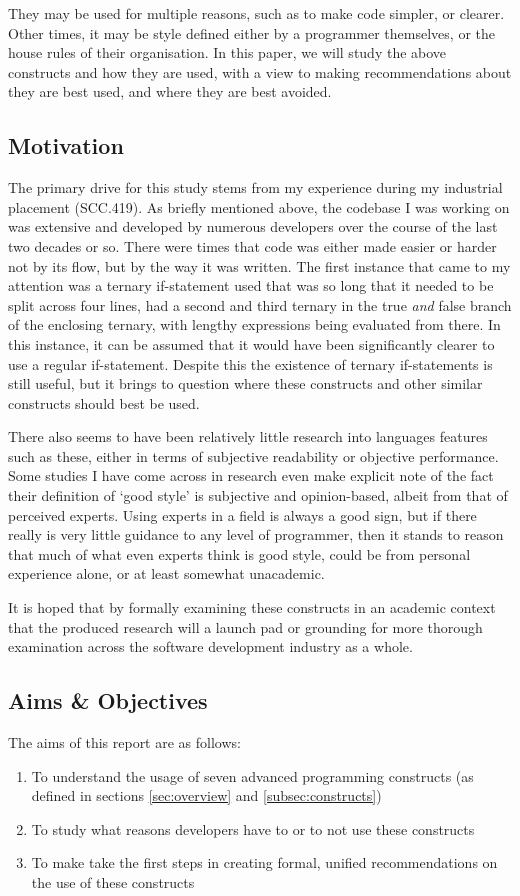 \documentclass{article}
\begin{document}
        They may be used for multiple reasons, such as to make code simpler, or clearer. Other times, it may be style defined either by a programmer themselves, or the house rules of their organisation.  In this paper, we will study the above constructs and how they are used, with a view to making recommendations about they are best used, and where they are best avoided.
    \subsection{Motivation}
        The primary drive for this study stems from my experience during my industrial placement (SCC.419). As briefly mentioned above, the codebase I was working on was extensive and developed by numerous developers over the course of the last two decades or so. There were times that code was either made easier or harder not by its flow, but by the way it was written. The first instance that came to my attention was a ternary if-statement used that was so long that it needed to be split across four lines, had a second and third ternary in the true \emph{and} false branch of the enclosing ternary, with lengthy expressions being evaluated from there. In this instance, it can be assumed that it would have been significantly clearer to use a regular if-statement. Despite this the existence of ternary if-statements is still useful, but it brings to question where these constructs and other similar constructs should best be used.

        There also seems to have been relatively little research into languages features such as these, either in terms of subjective readability or objective performance. Some studies I have come across in research even make explicit note of the fact their definition of `good style' is subjective and opinion-based, albeit from that of perceived experts. Using experts in a field is always a good sign, but if there really is very little guidance to any level of programmer, then it stands to reason that much of what even experts think is good style, could be from personal experience alone, or at least somewhat unacademic.
        
        It is hoped that by formally examining these constructs in an academic context that the produced research will a launch pad or grounding for more thorough examination across the software development industry as a whole.
    \subsection{Aims \& Objectives}
        The aims of this report are as follows:
        \begin{enumerate}
            \item To understand the usage of seven advanced programming constructs (as defined in sections \ref{sec:overview} and \ref{subsec:constructs})
            \item To study what reasons developers have to or to not use these constructs
            \item To make take the first steps in creating formal, unified recommendations on the use of these constructs 
        \end{enumerate}
\end{document}
